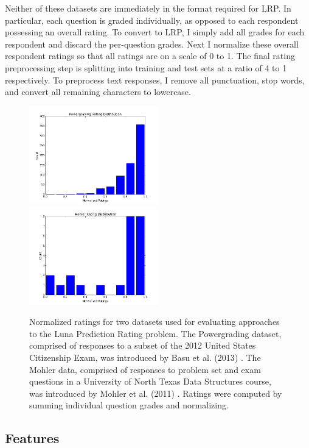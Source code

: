 Neither of these datasets are immediately in the format required for LRP. In particular, each question is graded individually, as opposed to each respondent possessing an overall rating. To convert to LRP, I simply add all grades for each respondent and discard the per-question grades. Next I normalize these overall respondent ratings so that all ratings are on a scale of 0 to 1. The final rating preprocessing step is splitting into training and test sets at a ratio of 4 to 1 respectively. To preprocess text responses, I remove all punctuation, stop words, and convert all remaining characters to lowercase.

\begin{figure}[h]
\centerline{%
\includegraphics[width=0.5\textwidth]{figures/powerGradingDistribution.png}%
\includegraphics[width=0.5\textwidth] {figures/mohlerRatings.png}%
}%
\caption{Normalized ratings for two datasets used for evaluating approaches to the Luna Prediction Rating problem. The Powergrading dataset, comprised of responses to a subset of the 2012 United States Citizenship Exam, was introduced by Basu et al. (2013) \cite{basu13}. The Mohler data, comprised of responses to problem set and exam questions in a University of North Texas Data Structures course, was introduced by Mohler et al. (2011) \cite{mohler11}. Ratings were computed by summing individual question grades and normalizing.}
\label{fig:RatingDistribution}
\end{figure}

\subsection{Features}

